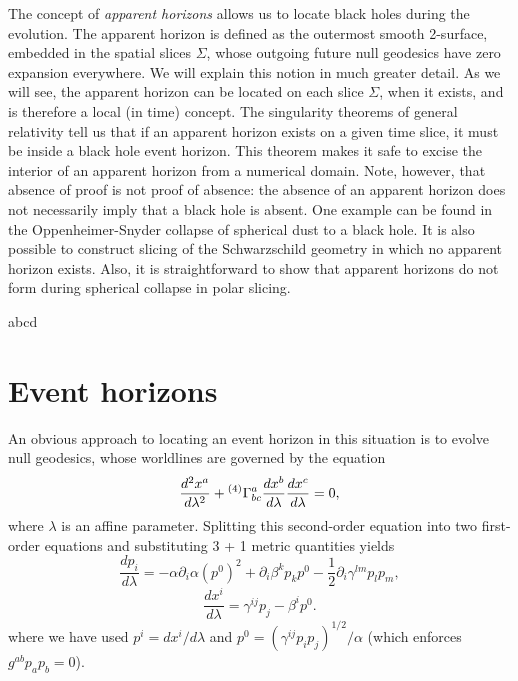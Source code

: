The concept of \textit{apparent horizons} allows us to locate black holes during the evolution. The apparent horizon is defined as the outermost smooth 2-surface, embedded in the spatial slices $\Sigma$, whose outgoing future null geodesics have zero expansion everywhere. We will explain this notion in much greater detail. As we will see, the apparent horizon can be located on each slice $\Sigma$, when it exists, and is therefore a local (in time) concept. The singularity theorems of general relativity tell us that if an apparent horizon exists on a given time slice, it must be inside a black hole event horizon. This theorem makes it safe to excise the interior of an apparent horizon from a numerical domain. Note, however, that absence of proof is not proof of absence: the absence of an apparent horizon does not necessarily imply that a black hole is absent. One example can be found in the Oppenheimer-Snyder collapse of spherical dust to a black hole. It is also possible to construct slicing of the Schwarzschild geometry in which no apparent horizon exists. Also, it is straightforward to show that apparent horizons do not form during spherical collapse in polar slicing.

\begin{remark}
	abcd
\end{remark}

\section{Event horizons}

An obvious approach to locating an event horizon in this situation is to evolve null geodesics, whose worldlines are governed by the equation
\begin{equation}
	\frac{d^2x^a}{d\lambda^2} + {}^{(4)} \Gamma^a_{bc}\frac{dx^b}{d\lambda}\frac{dx^c}{d\lambda} = 0,
\end{equation}
where $\lambda$ is an affine parameter. Splitting this second-order equation into two first-order equations and substituting 3 + 1 metric quantities yields
\begin{equation}
	\frac{dp_i}{d\lambda} = - \alpha \partial_i \alpha (p^0)^2 + \partial_i \beta^k p_k p^0 - \frac{1}{2}\partial_i \gamma^{lm} p_l p_m, \label{eq:7.6a}
\end{equation}
\begin{equation}
	\frac{dx^i}{d\lambda} = \gamma^{ij}p_j - \beta^i p^0. \label{eq:7.6b}
\end{equation}
where we have used $p^i = dx^i / d\lambda$ and $p^0 = (\gamma^{ij}p_ip_j)^{1/2}/\alpha$ (which enforces $g^{ab}p_ap_b = 0$).

